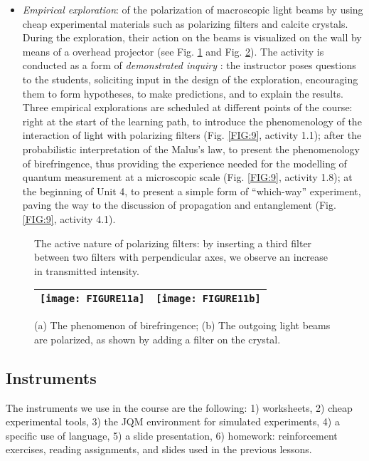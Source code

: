 \documentclass[twocolumn,secnumarabic,amssymb, nobibnotes, aps, prd, nofootinbib]{revtex4-2}
\begin{document}
\begin{itemize}
    \item \textit{Empirical exploration}: of the polarization of macroscopic light beams by using cheap experimental materials such as polarizing filters and calcite crystals. During the exploration, their action on the beams is visualized on the wall by means of a overhead projector (see Fig. \ref{FIG:10} and Fig. \ref{FIG:11}). The activity is conducted as a form of \emph{demonstrated inquiry} \cite{Llewellyn2012}: the instructor poses questions to the students, soliciting input in the design of the exploration, encouraging them to form hypotheses, to make predictions, and to explain the results. Three empirical explorations are scheduled at different points of the course: right at the start of the learning path, to introduce the phenomenology of the interaction of light with polarizing filters (Fig. \ref{FIG:9}, activity 1.1); after the probabilistic interpretation of the Malus's law, to present the phenomenology of birefringence, thus providing the experience needed for the modelling of quantum measurement at a microscopic scale (Fig. \ref{FIG:9}, activity 1.8); at the beginning of Unit 4, to present a simple form of ``which-way'' experiment, paving the way to the discussion of propagation and entanglement (Fig. \ref{FIG:9}, activity 4.1).
\end{itemize}
\begin{figure}[!htpb]
    \caption{The active nature of polarizing filters: by inserting a third filter between two filters with perpendicular axes, we observe an increase in transmitted intensity.}
    \label{FIG:10}
\end{figure}
\begin{figure} \centering
\begin{tabular}{|r|l|} \hline
    \texttt{[image: FIGURE11a]} &
    \texttt{[image: FIGURE11b]} \\ \hline
\end{tabular}
    \caption{(a) The phenomenon of birefringence; (b) The outgoing light beams are polarized, as shown by adding a filter on the crystal.}
    \label{FIG:11}
\end{figure}

\subsection{Instruments}
The instruments we use in the course are the following: 1) worksheets, 2) cheap experimental tools, 3) the JQM environment for simulated experiments, 4) a specific use of language, 5) a slide presentation, 6) homework: reinforcement exercises, reading assignments, and slides used in the previous lessons.
\end{document}
